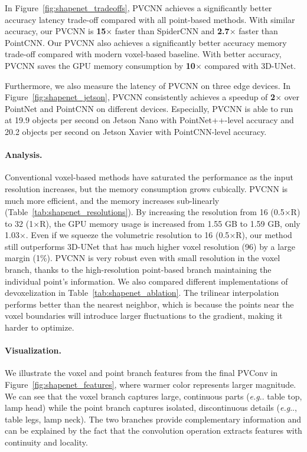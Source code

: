 \documentclass{article}
\makeatletter
\newcommand{\fig}[1]{Figure~\ref{#1}}
\newcommand{\tab}[1]{Table~\ref{#1}}
\DeclareRobustCommand\onedot{\futurelet\@let@token\@onedot}
\def\@onedot{\ifx\@let@token.\else.\null\fi\xspace}
\def\eg{\emph{e.g}\onedot} \def\Eg{\emph{E.g}\onedot}
\newcommand{\myparagraph}[1]{\vspace{-6pt}\paragraph{#1}}
\def\modelshort{PVCNN\xspace}
\def\convshort{PVConv\xspace}
\makeatother
\begin{document}
In \fig{fig:shapenet_tradeoffs}, \modelshort achieves a significantly better accuracy \vs latency trade-off compared with all point-based methods. With similar accuracy, our \modelshort is \textbf{15$\times$} faster than SpiderCNN and \textbf{2.7$\times$} faster than PointCNN. Our \modelshort also achieves a significantly better accuracy \vs memory trade-off compared with modern voxel-based baseline. With better accuracy, \modelshort saves the GPU memory consumption by \textbf{10$\times$} compared with 3D-UNet.

Furthermore, we also measure the latency of \modelshort on three edge devices. In \fig{fig:shapenet_jetson}, \modelshort consistently achieves a speedup of \textbf{2$\times$} over PointNet and PointCNN  on different devices. Especially, \modelshort is able to run at 19.9 objects per second on Jetson Nano with PointNet++-level accuracy and 20.2 objects per second on Jetson Xavier with PointCNN-level accuracy.

\myparagraph{Analysis.}

Conventional voxel-based methods have saturated the performance as the input resolution increases, but the memory consumption grows cubically. \modelshort is much more efficient, and the memory increases sub-linearly (\tab{tab:shapenet_resolutions}). By increasing the resolution from 16 (0.5$\times$R) to 32 (1$\times$R), the GPU memory usage is increased from 1.55 GB to 1.59 GB, only 1.03$\times$. Even if we squeeze the volumetric resolution to 16 (0.5$\times$R), our method still outperforms 3D-UNet that has much higher voxel resolution (96) by a large margin (1\%). \modelshort is very robust even with small resolution in the voxel branch, thanks to the high-resolution point-based branch maintaining the individual point's information. We also compared different implementations of devoxelization in \tab{tab:shapenet_ablation}. The trilinear interpolation performs better than the nearest neighbor, which is because the points near the voxel boundaries will introduce larger fluctuations to the gradient, making it harder to optimize.

\myparagraph{Visualization.}

We illustrate the voxel and point branch features from the final \convshort in \fig{fig:shapenet_features}, where warmer color represents larger magnitude. We can see that the voxel branch captures large, continuous parts (\eg table top, lamp head) while the point branch captures isolated, discontinuous details (\eg, table legs, lamp neck). The two branches provide complementary information and can be explained by the fact that the convolution operation extracts features with continuity and locality.
\end{document}
